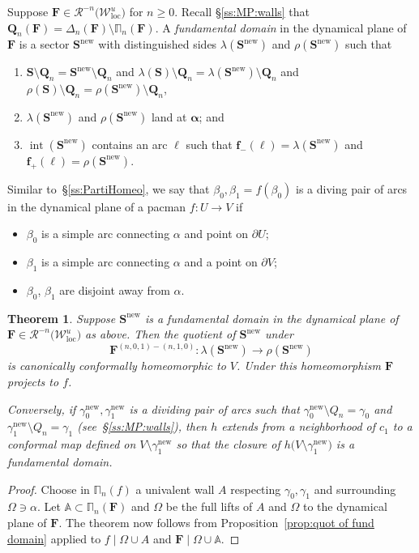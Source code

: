 \documentclass{amsart}
\newcommand{\1}{{\mathbb 1 }}
\newcommand{\bDelta}{{\mathbb{\Delta}}}
\newcommand{\bPi}{{\mathbb{\Pi}}}
\newcommand{\bA}{{\mathbb{A}}}
\newcommand\RR{\mathcal{R}}
\newcommand\intr{\operatorname{int}}
\newcommand{\bF}{{\mathbf F}}
\newcommand{\bQ}{{\mathbf Q}}
\newcommand{\bS}{{\mathbf S}}
\newcommand{\bbf}{{\mathbf f}}
\newcommand\inn{{\Omega}}
\newcommand\binn{{\mathbb \inn}}
\def\loc{{\mathrm{loc}}}
\newcommand\UnstLoc{{\boldsymbol{\mathcal{W}}^u_\loc}}
\newcommand\new{{\operatorname{new}}}
\newtheorem{thm}{Theorem}[section]
\theoremstyle{remark}
\numberwithin{equation}{section}
\theoremstyle{definition}
\newcommand{\balpha}{{\boldsymbol \alpha}}
\theoremstyle{nonumberbreak}
\begin{document}
Suppose $\bF\in \RR^{-n}\big( \UnstLoc\big)$ for $n\ge 0$. Recall \S\ref{ss:MP:walls} that ${\bQ_n(\bF)=\bDelta_n(\bF)\setminus \bPi_n(\bF)}$. 
A \emph{fundamental domain} in the dynamical plane of $\bF$ is a sector $\bS^\new$ with distinguished sides $\lambda(\bS^\new)$ and $\rho(\bS^\new)$ such that 
\begin{enumerate}
\item $\bS\setminus \bQ_n=\bS^\new\setminus \bQ_n$ and $\lambda(\bS)\setminus \bQ_n=\lambda(\bS^\new)\setminus \bQ_n$ and\newline ${\rho(\bS)\setminus \bQ_n=\rho(\bS^\new)\setminus \bQ_n}$, \label{cond:1:fund domain}
\item $\lambda(\bS^\new)$ and $\rho(\bS^\new)$ land at $\balpha$; and\label{cond:2:fund domain}
\item $\intr(\bS^\new)$ contains an arc $\ell$ such that $\bbf_-(\ell)=\lambda( \bS^\new)$ and $\bbf_+(\ell)=\rho( \bS^\new)$.\label{cond:3:fund domain}
\end{enumerate}


Similar to~\S\ref{ss:PartiHomeo}, we say that $\beta_0,\beta_1=f(\beta_0)$ is a diving pair of arcs in the dynamical plane of a pacman $f\colon U\to V$ if
\begin{itemize}
\item  $\beta_0$ is a simple arc connecting $\alpha$ and point on $\partial U$;
\item  $\beta_1$ is a simple arc connecting $\alpha$ and a point on $\partial V$; 
\item $\beta_0$, $\beta_1$ are disjoint away from $\alpha$.
\end{itemize} 


\begin{thm}
\label{thm:quot of fund domain}
Suppose $\bS^\new$ is a fundamental domain in the dynamical plane of $\bF\in  \RR^{-n}\big( \UnstLoc\big)$ as above. Then the quotient of $\bS^\new$ under 
 \[\bF^{(n,0,1)-(n,1,0)}\colon \lambda( \bS^\new)\to \rho( \bS^\new)\] is canonically conformally homeomorphic to $V$. Under this homeomorphism $\bF$ projects to $f$.
 
 Conversely, if $\gamma_0^\new,\gamma_1^\new$ is a dividing pair of arcs such that $\gamma_0^\new\setminus Q_n=\gamma_0$ and $\gamma_1^\new\setminus Q_n=\gamma_1$ (see~\S\ref{ss:MP:walls}), then $h$ extends from a neighborhood of $c_1$ to a conformal map defined on $V\setminus \gamma_1^\new$ so that the closure of $h\big(V\setminus \gamma_1^\new \big)$ is a fundamental domain.
\end{thm}
\begin{proof}
Choose in $\bPi_n(f)$ a univalent wall $A$ respecting $\gamma_0,\gamma_1$ and surrounding $\inn\ni\alpha$. Let $\bA\subset \bPi_n(\bF)$ and $\binn$ be the full lifts of $A$ and $\inn$ to the dynamical plane of $\bF$. The theorem now follows from Proposition~\ref{prop:quot of fund domain} applied to $f\mid \inn\cup A$ and $\bF\mid \binn\cup \bA$.
\end{proof}
\end{document}
